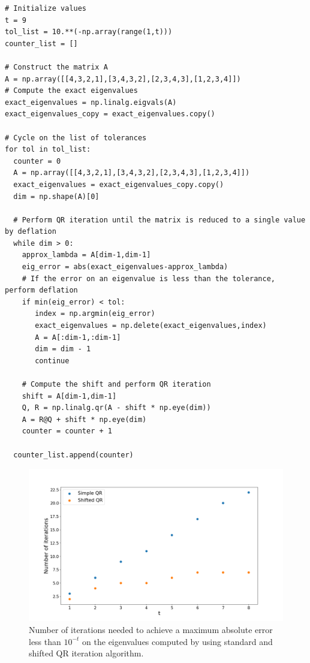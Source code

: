 \documentclass[a4paper,11pt]{article}
\begin{document}
\begin{verbatim}
# Initialize values
t = 9
tol_list = 10.**(-np.array(range(1,t)))
counter_list = []

# Construct the matrix A
A = np.array([[4,3,2,1],[3,4,3,2],[2,3,4,3],[1,2,3,4]])
# Compute the exact eigenvalues
exact_eigenvalues = np.linalg.eigvals(A)
exact_eigenvalues_copy = exact_eigenvalues.copy()

# Cycle on the list of tolerances
for tol in tol_list:
  counter = 0
  A = np.array([[4,3,2,1],[3,4,3,2],[2,3,4,3],[1,2,3,4]])
  exact_eigenvalues = exact_eigenvalues_copy.copy()
  dim = np.shape(A)[0]

  # Perform QR iteration until the matrix is reduced to a single value by deflation
  while dim > 0:
    approx_lambda = A[dim-1,dim-1]
    eig_error = abs(exact_eigenvalues-approx_lambda)
    # If the error on an eigenvalue is less than the tolerance, perform deflation
    if min(eig_error) < tol:
       index = np.argmin(eig_error)
       exact_eigenvalues = np.delete(exact_eigenvalues,index)
       A = A[:dim-1,:dim-1]
       dim = dim - 1 
       continue

    # Compute the shift and perform QR iteration
    shift = A[dim-1,dim-1]
    Q, R = np.linalg.qr(A - shift * np.eye(dim))
    A = R@Q + shift * np.eye(dim)
    counter = counter + 1

  counter_list.append(counter)
\end{verbatim}

\begin{figure}[H]
	\centering
	\includegraphics[scale=0.40]{Plot/Plot_QR_Standard_Rayleigh.png}
	\caption{Number of iterations needed to achieve a maximum absolute error less than $10^{-t}$ on the eigenvalues computed by using standard and shifted QR iteration algorithm.}
	\label{Fig:Num_iter_with_t}
\end{figure}
\end{document}
